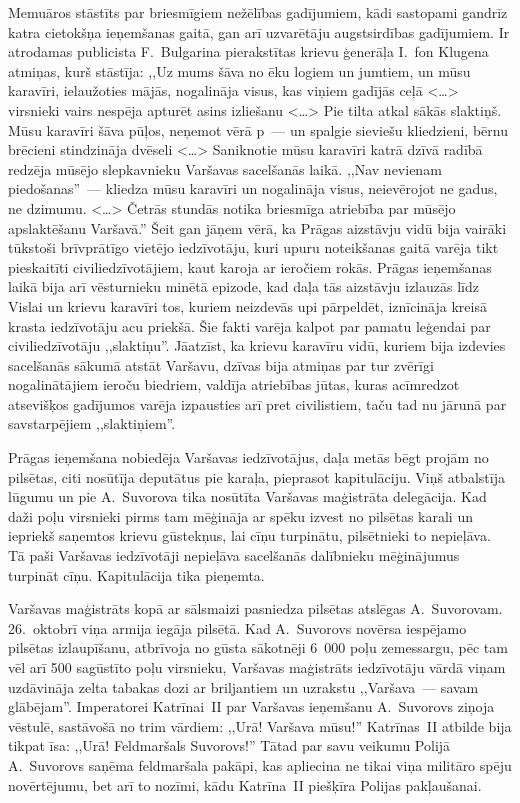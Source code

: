 \documentclass[twoside,a5paper,12pt,fleqn,openany]{extbook}
\newcommand{\citespace}{<\dots{}>}
\begin{document}
Memuāros stāstīts par briesmīgiem nežēlības gadījumiem, kādi sastopami gandrīz katra cietokšņa ieņemšanas gaitā, gan arī uzvarētāju augstsirdības gadījumiem. Ir atrodamas publicista F.~Bulgarina pierakstītas krievu ģenerāļa I.~fon Klugena atmiņas, kurš stāstīja: ,,Uz mums šāva no ēku logiem un jumtiem, un mūsu karavīri, ielaužoties mājās, nogalināja visus, kas viņiem gadījās ceļā \citespace{} virsnieki vairs nespēja apturēt asins izliešanu \citespace{} Pie tilta atkal sākās slaktiņš. Mūsu karavīri šāva pūļos, neņemot vērā p~--- un spalgie sieviešu kliedzieni, bērnu brēcieni stindzināja dvēseli \citespace{} Saniknotie mūsu karavīri katrā dzīvā radībā redzēja mūsējo slepkavnieku Varšavas sacelšanās laikā. ,,Nav nevienam piedošanas''~--- kliedza mūsu karavīri un nogalināja visus, neievērojot ne gadus, ne dzimumu. \citespace{} Četrās stundās notika briesmīga atriebība par mūsējo apslaktēšanu Varšavā.'' Šeit gan jāņem vērā, ka Prāgas aizstāvju vidū bija vairāki tūkstoši brīvprātīgo vietējo iedzīvotāju, kuri upuru noteikšanas gaitā varēja tikt pieskaitīti civiliedzīvotājiem, kaut karoja ar ieročiem rokās. Prāgas ieņemšanas laikā bija arī vēsturnieku minētā epizode, kad daļa tās aizstāvju izlauzās līdz Vislai un krievu karavīri tos, kuriem neizdevās upi pārpeldēt, iznīcināja kreisā krasta iedzīvotāju acu priekšā. Šie fakti varēja kalpot par pamatu leģendai par civiliedzīvotāju ,,slaktiņu''. Jāatzīst, ka krievu karavīru vidū, kuriem bija izdevies sacelšanās sākumā atstāt Varšavu, dzīvas bija atmiņas par tur zvērīgi nogalinātājiem ieroču biedriem, valdīja atriebības jūtas, kuras acīmredzot atsevišķos gadījumos varēja izpausties arī pret civilistiem, taču tad nu jārunā par savstarpējiem ,,slaktiņiem''.

Prāgas ieņemšana nobiedēja Varšavas iedzīvotājus, daļa metās bēgt projām no pilsētas, citi nosūtīja deputātus pie karaļa, pieprasot kapitulāciju. Viņš atbalstīja lūgumu un pie A.~Suvorova tika nosūtīta Varšavas maģistrāta delegācija. Kad daži poļu virsnieki pirms tam mēģināja ar spēku izvest no pilsētas karali un iepriekš saņemtos krievu gūstekņus, lai cīņu turpinātu, pilsētnieki to nepieļāva. Tā paši Varšavas iedzīvotāji nepieļāva sacelšanās dalībnieku mēģinājumus turpināt cīņu. Kapitulācija tika pieņemta.

Varšavas maģistrāts kopā ar sālsmaizi pasniedza pilsētas atslēgas A.~Suvorovam. 26.~oktobrī viņa armija iegāja pilsētā. Kad A.~Suvorovs novērsa iespējamo pilsētas izlaupīšanu, atbrīvoja no gūsta sākotnēji 6~000 poļu zemessargu, pēc tam vēl arī 500 sagūstīto poļu virsnieku, Varšavas maģistrāts iedzīvotāju vārdā viņam uzdāvināja zelta tabakas dozi ar briljantiem un uzrakstu ,,Varšava~--- savam glābējam''. Imperatorei Katrīnai~II par Varšavas ieņemšanu A.~Suvorovs ziņoja vēstulē, sastāvošā no trim vārdiem: ,,Urā! Varšava mūsu!'' Katrīnas~II atbilde bija tikpat īsa: ,,Urā! Feldmaršals Suvorovs!'' Tātad par savu veikumu Polijā A.~Suvorovs saņēma feldmaršala pakāpi, kas apliecina ne tikai viņa militāro spēju novērtējumu, bet arī to nozīmi, kādu Katrīna~II piešķīra Polijas pakļaušanai.
\end{document}
